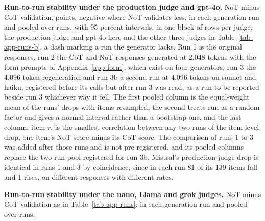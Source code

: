 \begin{table}
\centering
\small
\caption{\textbf{Run-to-run stability under the production judge and gpt-4o.}
NoT minus CoT validation, points, negative where NoT validates less,
in each generation run and pooled over runs, with 95 percent intervals, in
one block of rows per judge, the production judge and gpt-4o here and the
other three judges in Table~\ref{tab-app-runs-b}, a dash marking a run
the generator lacks.
Run 1 is the original
responses, run 2 the CoT and NoT responses generated at 2,048 tokens with the
form prompts of Appendix~\ref{app-form}, which exist on four generators, run
3 the 4,096-token regeneration and run 3b a second
run at 4,096 tokens on sonnet and haiku, registered before its
calls but after run 3 was read, as a run to be reported beside run 3
whichever way it fell. The first pooled column is the equal-weight mean of
the runs' drops with items resampled, the second treats run as a random
factor and gives a normal interval rather than a bootstrap one, and the last
column, item $r$, is the smallest correlation between any two runs of the
item-level drop, one item's NoT score minus its CoT score. The comparison of runs 1 to 3 was added after those runs and is not
pre-registered, and its pooled columns replace the two-run pool registered
for run 3b. Mistral's production-judge drop is identical in runs 1 and 3 by
coincidence, since in each run 81 of its 139 items fall and 1 rises, on
different responses with different rates.}
\label{tab-app-runs}

\end{table}

\begin{table}
\centering
\small
\caption{\textbf{Run-to-run stability under the nano, Llama and grok judges.}
NoT minus CoT validation as in Table~\ref{tab-app-runs}, in each
generation run and pooled over runs.}
\label{tab-app-runs-b}

\end{table}

